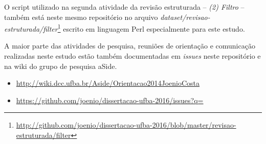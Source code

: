 O script utilizado na segunda atividade da revisão estruturada -- {\it (2)
Filtro} -- também está neste mesmo repositório no arquivo {\it
dataset/revisao-estruturada/filter}\footnote{\url{http://github.com/joenio/dissertacao-ufba-2016/blob/master/revisao-estruturada/filter}}
escrito em linguagem Perl especialmente para este estudo.

A maior parte das atividades de pesquisa, reuniões de orientação e comunicação
realizadas neste estudo estão também documentadas em {\it issues} neste
repositório e na wiki do grupo de pesquisa aSide.

\begin{itemize}
  \item \url{http://wiki.dcc.ufba.br/Aside/Orientacao2014JoenioCosta}
  \item \url{https://github.com/joenio/dissertacao-ufba-2016/issues?q=}
\end{itemize}
